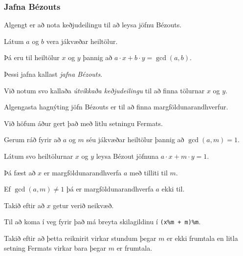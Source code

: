 {
	\frametitle{Jafna Bézouts}
	{
		\item<1-> Algengt er að nota keðjudeilingu til að leysa jöfnu Bézouts.
		\item<2-> Látum $a$ og $b$ vera jákvæðar heiltölur.
		\item<3-> Þá eru til heiltölur $x$ og $y$ þannig að $a \cdot x + b \cdot y = \gcd(a, b)$.
		\item<4-> Þessi jafna kallast \emph{jafna Bézouts}.
		\item<5-> Við notum svo kallaða \emph{útvíkkaða keðjudeilingu} til að finna tölurnar $x$ og $y$.
		\item<6->[] 
	}
}

{
	{
		\item<1-> Algengasta hagnýting jöfn Bézouts er til að finna margföldunarandhverfur.
		\item<2-> Við höfum áður gert það með litlu setningu Fermats.
		\item<3-> Gerum ráð fyrir að $a$ og $m$ séu jákvæðar heiltölur þannig að $\gcd(a, m) = 1$.
		\item<4-> Látum svo heiltölurnar $x$ og $y$ leysa Bézout jöfnuna $a \cdot x + m \cdot y = 1$.
		\item<5-> Þá fæst að $x$ er margföldunarandhverfa $a$ með tilliti til $m$.
		\item<6-> Ef $\gcd(a, m) \neq 1$ þá er margföldunarandhverfa $a$ ekki til.
		\item<7->[] 
		\item<8-> Takið eftir að $x$ getur verið neikvæð.
		\item<9-> Til að koma í veg fyrir það má breyta skilagildinu í \texttt{(x\%m + m)\%m}.
	}
}

{
	{
		\item<1-> Takið eftir að þetta reiknirit virkar stundum þegar $m$ er ekki frumtala en litla setning Fermats virkar bara þegar $m$ er frumtala.
	}
}

{
}


